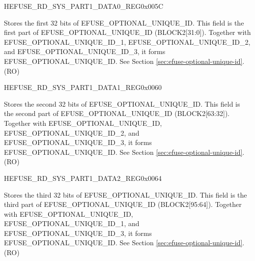 \begin{register}{H}{EFUSE\_RD\_SYS\_PART1\_DATA0\_REG}{0x005C}\label{regdesc:EFUSERDSYSPART1DATA0REG}
%
\regnewline%
\begin{regdesc}\begin{reglist}
\label{fielddesc:EFUSEOPTIONALUNIQUEID}\item [EFUSE\_OPTIONAL\_UNIQUE\_ID] Stores the first 32 bits of EFUSE\_OPTIONAL\_UNIQUE\_ID. This field is the first part of EFUSE\_OPTIONAL\_UNIQUE\_ID (BLOCK2[31:0]). Together with EFUSE\_OPTIONAL\_UNIQUE\_ID\_1, EFUSE\_OPTIONAL\_UNIQUE\_ID\_2, and EFUSE\_OPTIONAL\_UNIQUE\_ID\_3, it forms EFUSE\_OPTIONAL\_UNIQUE\_ID. See Section \ref{sec:efuse-optional-unique-id}. (RO)
\end{reglist}\end{regdesc}
\end{register}


\begin{register}{H}{EFUSE\_RD\_SYS\_PART1\_DATA1\_REG}{0x0060}\label{regdesc:EFUSERDSYSPART1DATA1REG}
%
\regnewline%
\begin{regdesc}\begin{reglist}
\label{fielddesc:EFUSEOPTIONALUNIQUEID1}\item [EFUSE\_OPTIONAL\_UNIQUE\_ID\_1] Stores the second 32 bits of EFUSE\_OPTIONAL\_UNIQUE\_ID. This field is the second part of EFUSE\_OPTIONAL\_UNIQUE\_ID (BLOCK2[63:32]). Together with EFUSE\_OPTIONAL\_UNIQUE\_ID, EFUSE\_OPTIONAL\_UNIQUE\_ID\_2, and EFUSE\_OPTIONAL\_UNIQUE\_ID\_3, it forms EFUSE\_OPTIONAL\_UNIQUE\_ID. See Section \ref{sec:efuse-optional-unique-id}. (RO)
\end{reglist}\end{regdesc}
\end{register}


\begin{register}{H}{EFUSE\_RD\_SYS\_PART1\_DATA2\_REG}{0x0064}\label{regdesc:EFUSERDSYSPART1DATA2REG}
%
\regnewline%
\begin{regdesc}\begin{reglist}
\label{fielddesc:EFUSEOPTIONALUNIQUEID2}\item [EFUSE\_OPTIONAL\_UNIQUE\_ID\_2] Stores the third 32 bits of EFUSE\_OPTIONAL\_UNIQUE\_ID. This field is the third part of EFUSE\_OPTIONAL\_UNIQUE\_ID (BLOCK2[95:64]). Together with EFUSE\_OPTIONAL\_UNIQUE\_ID, EFUSE\_OPTIONAL\_UNIQUE\_ID\_1, and EFUSE\_OPTIONAL\_UNIQUE\_ID\_3, it forms EFUSE\_OPTIONAL\_UNIQUE\_ID. See Section \ref{sec:efuse-optional-unique-id}. (RO)
\end{reglist}\end{regdesc}
\end{register}


